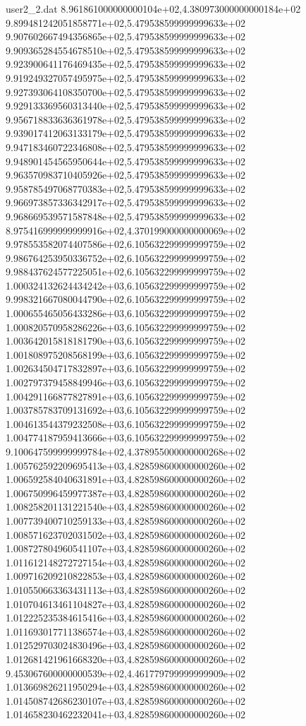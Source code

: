 \begin{filecontents}{user2_2.dat}
8.961861000000000104e+02,4.380973000000000184e+02
9.899481242051858771e+02,5.479538599999999633e+02
9.907602667494356865e+02,5.479538599999999633e+02
9.909365284554678510e+02,5.479538599999999633e+02
9.923900641176469435e+02,5.479538599999999633e+02
9.919249327057495975e+02,5.479538599999999633e+02
9.927393064108350700e+02,5.479538599999999633e+02
9.929133369560313440e+02,5.479538599999999633e+02
9.956718833636361978e+02,5.479538599999999633e+02
9.939017412063133179e+02,5.479538599999999633e+02
9.947183460722346808e+02,5.479538599999999633e+02
9.948901454565950644e+02,5.479538599999999633e+02
9.963570983710405926e+02,5.479538599999999633e+02
9.958785497068770383e+02,5.479538599999999633e+02
9.966973857336342917e+02,5.479538599999999633e+02
9.968669539571587848e+02,5.479538599999999633e+02
8.975416999999999916e+02,4.370199000000000069e+02
9.978553582074407586e+02,6.105632299999999759e+02
9.986764253950336752e+02,6.105632299999999759e+02
9.988437624577225051e+02,6.105632299999999759e+02
1.000324132624434242e+03,6.105632299999999759e+02
9.998321667080044790e+02,6.105632299999999759e+02
1.000655465056433286e+03,6.105632299999999759e+02
1.000820570958286226e+03,6.105632299999999759e+02
1.003642015818181790e+03,6.105632299999999759e+02
1.001808975208568199e+03,6.105632299999999759e+02
1.002634504717832897e+03,6.105632299999999759e+02
1.002797379458849946e+03,6.105632299999999759e+02
1.004291166877827891e+03,6.105632299999999759e+02
1.003785783709131692e+03,6.105632299999999759e+02
1.004613544379232508e+03,6.105632299999999759e+02
1.004774187959413666e+03,6.105632299999999759e+02
9.100647599999999784e+02,4.378955000000000268e+02
1.005762592209695413e+03,4.828598600000000260e+02
1.006592584040631891e+03,4.828598600000000260e+02
1.006750996459977387e+03,4.828598600000000260e+02
1.008258201131221540e+03,4.828598600000000260e+02
1.007739400710259133e+03,4.828598600000000260e+02
1.008571623702031502e+03,4.828598600000000260e+02
1.008727804960541107e+03,4.828598600000000260e+02
1.011612148272727154e+03,4.828598600000000260e+02
1.009716209210822853e+03,4.828598600000000260e+02
1.010550663363431113e+03,4.828598600000000260e+02
1.010704613461104827e+03,4.828598600000000260e+02
1.012225235384615416e+03,4.828598600000000260e+02
1.011693017711386574e+03,4.828598600000000260e+02
1.012529703024830496e+03,4.828598600000000260e+02
1.012681421961668320e+03,4.828598600000000260e+02
9.453067600000000539e+02,4.461779799999999909e+02
1.013669826211950294e+03,4.828598600000000260e+02
1.014508742686230107e+03,4.828598600000000260e+02
1.014658230462232041e+03,4.828598600000000260e+02

\end{filecontents}
